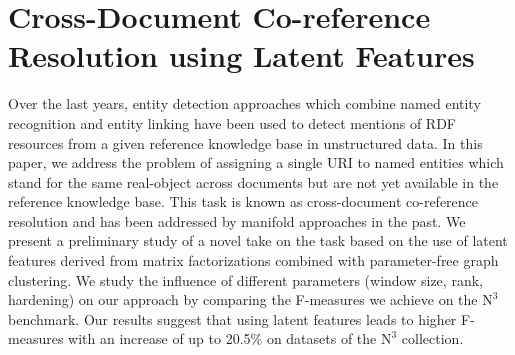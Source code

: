 

%

%


\chapter{Cross-Document Co-reference Resolution using Latent Features}




\newcommand{\goodgap}{%
}
Over the last years, entity detection approaches which combine named entity recognition and entity linking have been used to detect mentions of RDF resources from a given reference knowledge base in unstructured data. In this paper, we address the problem of assigning a single URI to named entities which stand for the same real-object across documents but are not yet available in the reference knowledge base. This task is known as cross-document co-reference resolution and has been addressed by manifold approaches in the past. We present a preliminary study of a novel take on the task based on the use of latent features derived from matrix factorizations combined with parameter-free graph clustering. 
We study the influence of different parameters (window size, rank, hardening) on our approach by comparing the F-measures we achieve on the $\mbox{N}^3$ benchmark.
Our results suggest that using latent features leads to higher F-measures with an increase of up to 20.5\% on datasets of the $\mbox{N}^3$ collection.

